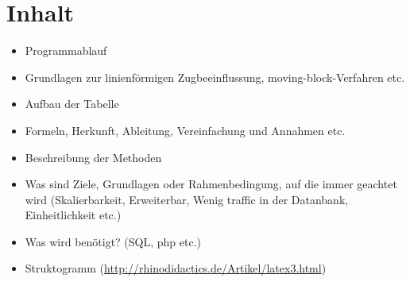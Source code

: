 \section{Inhalt}


\begin{itemize}
\item Programmablauf
\item Grundlagen zur linienförmigen Zugbeeinflussung, moving-block-Verfahren etc.
\item Aufbau der Tabelle
\item Formeln, Herkunft, Ableitung, Vereinfachung und Annahmen etc.
\item Beschreibung der Methoden
\item Was sind Ziele, Grundlagen oder Rahmenbedingung, auf die immer geachtet wird (Skalierbarkeit, Erweiterbar, Wenig \glqq traffic\grqq{} in der Datanbank, Einheitlichkeit etc.)
\item Was wird benötigt? (SQL, php etc.)
\item Struktogramm (\url {http://rhinodidactics.de/Artikel/latex3.html})
\end{itemize}